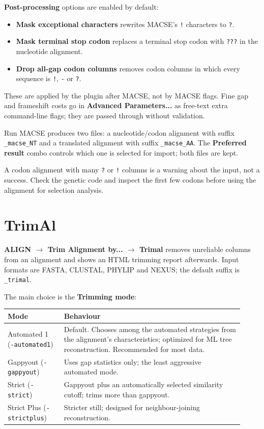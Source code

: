 \documentclass[10pt]{report}
\begin{document}
\textbf{Post-processing} options are enabled by default:

\begin{itemize}
  \item \textbf{Mask exceptional characters} rewrites MACSE's \texttt{!}
        characters to \texttt{?}.
  \item \textbf{Mask terminal stop codon} replaces a terminal stop codon with
        \texttt{???} in the nucleotide alignment.
  \item \textbf{Drop all-gap codon columns} removes codon columns in which
        every sequence is \texttt{!}, \texttt{-} or \texttt{?}.
\end{itemize}

These are applied by the plugin after MACSE, not by MACSE flags. Fine gap and
frameshift costs go in \textbf{Advanced Parameters...} as free-text extra
command-line flags; they are passed through without validation.

Run MACSE produces two files: a nucleotide/codon alignment with suffix
\texttt{\_macse\_NT} and a translated alignment with suffix
\texttt{\_macse\_AA}. The \textbf{Preferred result} combo controls which one is
selected for import; both files are kept.

\begin{warning}
A codon alignment with many \texttt{?} or \texttt{!} columns is a warning about
the input, not a success. Check the genetic code and inspect the first few
codons before using the alignment for selection analysis.
\end{warning}

\section{TrimAl}

\textbf{ALIGN $\rightarrow$ Trim Alignment by... $\rightarrow$ Trimal} removes
unreliable columns from an alignment \cite{trimal} and shows an HTML trimming
report afterwards. Input formats are FASTA, CLUSTAL, PHYLIP and NEXUS; the default
suffix is \texttt{\_trimal}.

The main choice is the \textbf{Trimming mode}:

\begin{longtable}{@{}>{\raggedright\arraybackslash}p{0.22\linewidth}
                      >{\raggedright\arraybackslash}p{0.70\linewidth}@{}}
\toprule
Mode & Behaviour \\
\midrule
\endhead
Automated 1 (\texttt{-automated1}) & Default. Chooses among the automated
strategies from the alignment's characteristics; optimized for ML tree
reconstruction. Recommended for most data. \\
Gappyout (\texttt{-gappyout}) & Uses gap statistics only; the least aggressive
automated mode. \\
Strict (\texttt{-strict}) & Gappyout plus an automatically selected similarity
cutoff; trims more than gappyout. \\
Strict Plus (\texttt{-strictplus}) & Stricter still; designed for
neighbour-joining reconstruction. \\
\bottomrule
\end{longtable}
\end{document}
